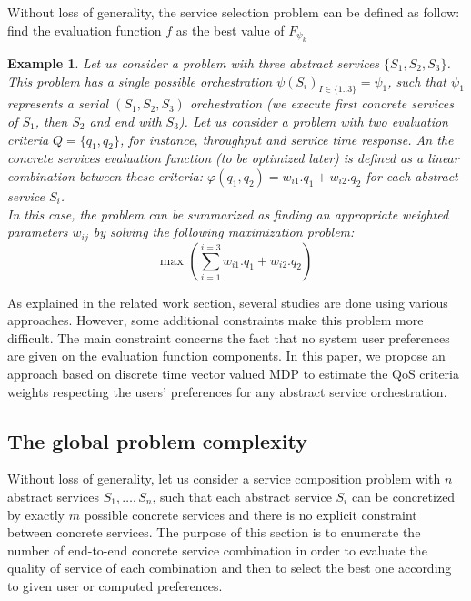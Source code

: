 \documentclass[10pt,journal,compsoc]{IEEEtran}
\newtheorem{example}{Example}
\begin{document}
Without loss of generality, the service selection problem can be defined as follow: find the evaluation function $f$ as the best value of $F_{\psi_k} $


\begin{example}\label{ex:linearComb} Let us consider a problem with three abstract services $\{S_1,S_2,S_3\}$. This problem has a single possible orchestration $\psi(S_i)_{I\in\{1..3\}}=\psi_1$, such that $\psi_1$ represents a serial $(S_1,S_2,S_3)$ orchestration (we execute first concrete services of $S_1$, then $S_2$ and end with $S_3$). Let us consider a problem with two evaluation criteria $Q=\{q_1,q_2\}$, for instance, throughput and service time response. An the concrete services evaluation function (to be optimized later) is defined as a linear combination between these criteria: $\varphi(q_1,q_2)= w_{i1}.q_1+w_{i2}.q_2$ for each abstract service $S_i$. \\
In this case, the problem can be summarized as finding an appropriate weighted parameters $w_{ij}$ by solving the following maximization problem:
$$ \text{max }(\sum_{i=1}^{i=3} w_{i1}.q_1+w_{i2}.q_2)$$
\end{example}

 
As explained in the related work section, several studies are done using various approaches. However, some additional constraints make this problem more difficult. The main constraint concerns the fact that no system user preferences are given on the evaluation function components. In this paper, we propose an approach based on discrete time vector valued MDP to estimate the QoS criteria weights respecting the users' preferences for any abstract service orchestration. 


\subsection{The global problem complexity}
Without loss of generality, let us consider a service composition problem with $n$ abstract services $S_1,\dots, S_n$, such that each abstract service $S_i$ can be concretized by exactly $m$ possible concrete services and there is no explicit constraint between concrete services. The purpose of this section is to enumerate the number of end-to-end concrete service combination in order to evaluate the quality of service of each combination and then to select the best one according to given user or computed preferences.
\end{document}
